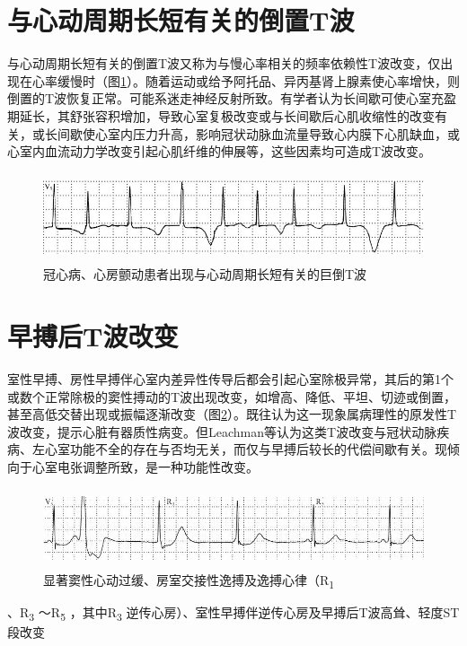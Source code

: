 \protect\hypertarget{text00012.htmlux5cux23subid97}{}{}

\section{与心动周期长短有关的倒置T波}

与心动周期长短有关的倒置T波又称为与慢心率相关的频率依赖性T波改变，仅出现在心率缓慢时（图\ref{fig6-16}）。随着运动或给予阿托品、异丙基肾上腺素使心率增快，则倒置的T波恢复正常。可能系迷走神经反射所致。有学者认为长间歇可使心室充盈期延长，其舒张容积增加，导致心室复极改变或与长间歇后心肌收缩性的改变有关，或长间歇使心室内压力升高，影响冠状动脉血流量导致心内膜下心肌缺血，或心室内血流动力学改变引起心肌纤维的伸展等，这些因素均可造成T波改变。

\begin{figure}[!htbp]
 \centering
 \includegraphics[width=5.39583in,height=1.03125in]{./images/Image00108.jpg}
 \captionsetup{justification=centering}
 \caption{冠心病、心房颤动患者出现与心动周期长短有关的巨倒T波}
 \label{fig6-16}
  \end{figure} 

\protect\hypertarget{text00012.htmlux5cux23subid98}{}{}

\section{早搏后T波改变}

室性早搏、房性早搏伴心室内差异性传导后都会引起心室除极异常，其后的第1个或数个正常除极的窦性搏动的T波出现改变，如增高、降低、平坦、切迹或倒置，甚至高低交替出现或振幅逐渐改变（图\ref{fig6-17}）。既往认为这一现象属病理性的原发性T波改变，提示心脏有器质性病变。但Leachman等认为这类T波改变与冠状动脉疾病、左心室功能不全的存在与否均无关，而仅与早搏后较长的代偿间歇有关。现倾向于心室电张调整所致，是一种功能性改变。

\begin{figure}[!htbp]
 \centering
 \includegraphics[width=5.59375in,height=0.91667in]{./images/Image00109.jpg}
 \captionsetup{justification=centering}
 \caption{显著窦性心动过缓、房室交接性逸搏及逸搏心律（R\textsubscript{1}}
 \label{fig6-17}
  \end{figure} 
、R\textsubscript{3} ～R\textsubscript{5} ，其中R\textsubscript{3}
逆传心房）、室性早搏伴逆传心房及早搏后T波高耸、轻度ST段改变

